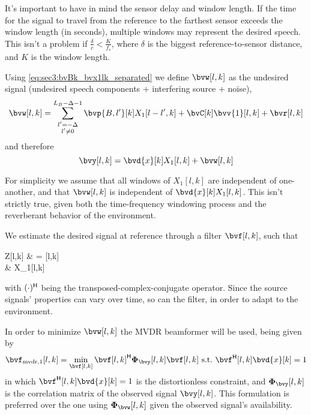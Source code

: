 It's important to have in mind the sensor delay and window length. If the time for the signal to travel from the reference to the farthest sensor exceeds the window length (in seconds), multiple windows may represent the desired speech. This isn't a problem if $\frac{\delta}{c} < \frac{K}{f_s}$, where $\delta$ is the biggest reference-to-sensor distance, and $K$ is the window length.

Using \cref{eq:sec3:bvBk_bvx1lk_separated} we define $\bvw[l,k]$ as the undesired signal (undesired speech components + interfering source + noise),
\begin{equation}
	\label{eq:sec3:def_undes_sig_bvwlk}
	\bvw[l,k] = \sum_{\substack{l'=-\Delta \\ l' \neq 0}}^{L_B-\Delta-1} \bvp{B,l'}[k] X_1[l-l',k] + \bvC[k] \bvv{1}[l,k] + \bvr[l,k]
\end{equation}
and therefore
\begin{equation}
    \label{eq:sec3:time-freq_model_final}
	\bvy[l,k] = \bvd{x}[k] X_1[l,k] + \bvw[l,k]
\end{equation}

For simplicity we assume that all windows of $X_{1}[l,k]$ are independent of one-another, and that $\bvw[l,k]$ is independent of  $\bvd{x}[k] X_1[l,k]$. This isn't strictly true, given both the time-frequency windowing process and the reverberant behavior of the environment.

We estimate the desired signal at reference through a filter $\bvf[l,k]$, such that
\begin{equations}
	Z[l,k]
	& = \he{\bvf}[l,k] \bvy[l,k] \\
	& \approx X_1[l,k]
\end{equations}
with $(\cdot)^{\mathsf{H}}$ being the transposed-complex-conjugate operator. Since the source signals' properties can vary over time, so can the filter, in order to adapt to the environment.

In order to minimize $\bvw[l,k]$ the MVDR beamformer \cite{erdogan_improved_2016} will be used, being given by
\begin{equation}
	\label{eq:sec3:minimization_problem_mvdr}
	\bvf_{\mvdr,1}[l,k] = \min_{\bvf[l,k]} \he{\bvf[l,k]} \Corr{\bvy}[l,k] \bvf[l,k]~\text{s.t.}~\he{\bvf}[l,k] \bvd{x}[k] = 1
\end{equation}
in which $\he{\bvf}[l,k] \bvd{x}[k] = 1$ is the distortionless constraint, and $\Corr{\bvy}[l,k]$ is the correlation matrix of the observed signal $\bvy[l,k]$. This formulation is preferred over the one using $\Corr{\bvw}[l,k]$ given the observed signal's availability.

